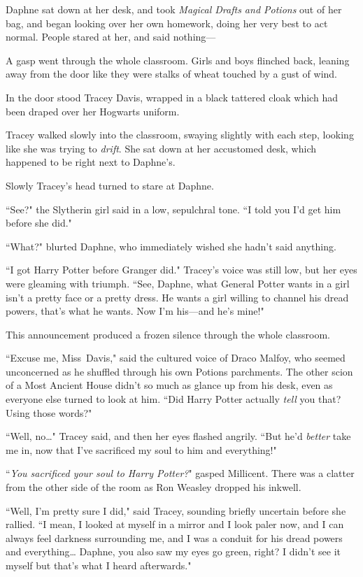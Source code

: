 Daphne sat down at her desk, and took \emph{Magical Drafts and Potions} out of her bag, and began looking over her own homework, doing her very best to act normal. People stared at her, and said nothing—

A gasp went through the whole classroom. Girls and boys flinched back, leaning away from the door like they were stalks of wheat touched by a gust of wind.

In the door stood Tracey Davis, wrapped in a black tattered cloak which had been draped over her Hogwarts uniform.

Tracey walked slowly into the classroom, swaying slightly with each step, looking like she was trying to \emph{drift}. She sat down at her accustomed desk, which happened to be right next to Daphne's.

Slowly Tracey's head turned to stare at Daphne.

``See?" the Slytherin girl said in a low, sepulchral tone. ``I told you I'd get him before she did."

``What?" blurted Daphne, who immediately wished she hadn't said anything.

``I got Harry Potter before Granger did." Tracey's voice was still low, but her eyes were gleaming with triumph. ``See, Daphne, what General Potter wants in a girl isn't a pretty face or a pretty dress. He wants a girl willing to channel his dread powers, that's what he wants. Now I'm his—and he's mine!"

This announcement produced a frozen silence through the whole classroom.

``Excuse me, Miss~Davis," said the cultured voice of Draco Malfoy, who seemed unconcerned as he shuffled through his own Potions parchments. The other scion of a Most Ancient House didn't so much as glance up from his desk, even as everyone else turned to look at him. ``Did Harry Potter actually \emph{tell} you that? Using those words?"

``Well, no{\ldots}" Tracey said, and then her eyes flashed angrily. ``But he'd \emph{better} take me in, now that I've sacrificed my soul to him and everything!"

``\emph{You sacrificed your soul to Harry Potter?}" gasped Millicent. There was a clatter from the other side of the room as Ron Weasley dropped his inkwell.

``Well, I'm pretty sure I did," said Tracey, sounding briefly uncertain before she rallied. ``I mean, I looked at myself in a mirror and I look paler now, and I can always feel darkness surrounding me, and I was a conduit for his dread powers and everything{\ldots} Daphne, you also saw my eyes go green, right? I didn't see it myself but that's what I heard afterwards."

